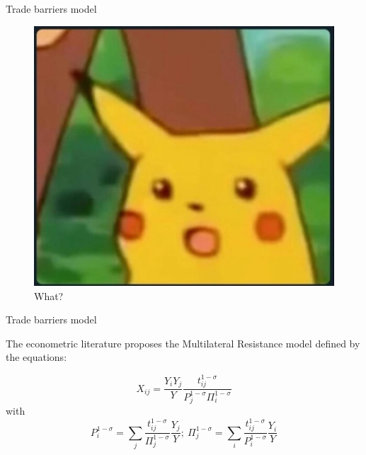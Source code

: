 \documentclass[ignorenonframetext,compress,aspectratio=169]{beamer}
\begin{document}
\begin{frame}{Trade barriers model}

\begin{figure}
\centering
\includegraphics{pikachu.jpg}
\caption{What?}
\end{figure}

\end{frame}

\begin{frame}{Trade barriers model}

The econometric literature proposes the Multilateral Resistance model
defined by the equations:

\[
X_{ij}=\frac{Y_{i}Y_{j}}{Y}\frac{t_{ij}^{1-\sigma}}{P_{j}^{1-\sigma}\Pi_{i}^{1-\sigma}}
\] with \[
P_{i}^{1-\sigma}=\sum_{j}\frac{t_{ij}^{1-\sigma}}{\Pi_{j}^{1-\sigma}}\frac{Y_{j}}{Y};\:\Pi_{j}^{1-\sigma}=\sum_{i}\frac{t_{ij}^{1-\sigma}}{P_{i}^{1-\sigma}}\frac{Y_{i}}{Y}
\]

\end{frame}
\end{document}
